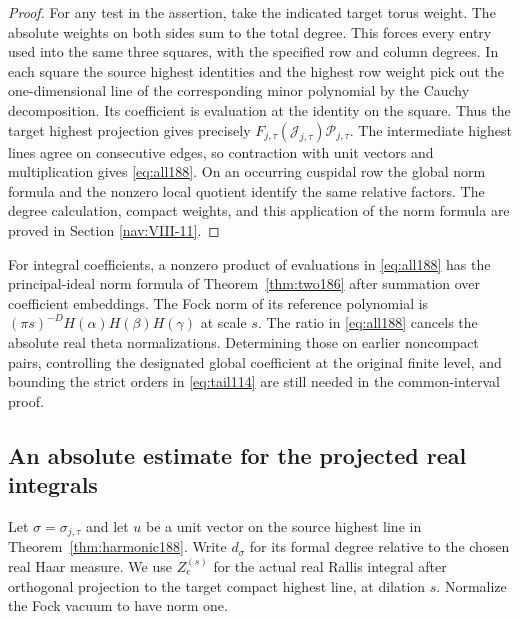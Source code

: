 \documentclass[a4paper,11pt]{article}
\theoremstyle{definition}
\theoremstyle{remark}
\numberwithin{equation}{section}
\begin{document}
\begin{proof}
For any test in the assertion, take the indicated target torus
weight. The absolute weights on both sides sum to the total
degree. This forces every entry used into the same three
squares, with the specified row and column degrees.
In each square the source highest identities and the highest
row weight pick out the one-dimensional line of the corresponding
minor polynomial by the Cauchy decomposition. Its coefficient
is evaluation at the identity on the square. Thus the target
highest projection gives precisely
\(F_{j,\tau}(\mathcal J_{j,\tau})\mathcal P_{j,\tau}\).
The intermediate highest lines agree on consecutive edges, so
contraction with unit vectors and multiplication gives
\eqref{eq:all188}. On an occurring cuspidal row the global norm
formula and the nonzero local quotient identify the same
relative factors. The degree calculation, compact weights,
and this application of the norm formula are proved in
Section \ref{nav:VIII-11}.
\end{proof}

For integral coefficients, a nonzero product of evaluations in
\eqref{eq:all188} has the principal-ideal norm formula of
Theorem~\ref{thm:two186} after summation over coefficient
embeddings. The Fock norm of its reference polynomial is
\((\pi s)^{-D}H(\alpha)H(\beta)H(\gamma)\) at scale \(s\).
The ratio in \eqref{eq:all188} cancels the absolute real theta
normalizations. Determining those on earlier noncompact pairs,
controlling the designated global coefficient at the original
finite level, and bounding the strict orders in
\eqref{eq:tail114} are still needed in the common-interval proof.

\subsection{An absolute estimate for the projected real integrals}\label{nav:VIII-27}
Let \(\sigma=\sigma_{j,\tau}\) and let \(u\) be a unit vector
on the source highest line in Theorem~\ref{thm:harmonic188}. Write
\(d_\sigma\) for its formal degree relative to the chosen real
Haar measure. We use \(Z_e^{(s)}\) for the actual real Rallis
integral after orthogonal projection to the target compact
highest line, at dilation \(s\). Normalize the Fock vacuum to
have norm one.
\end{document}
